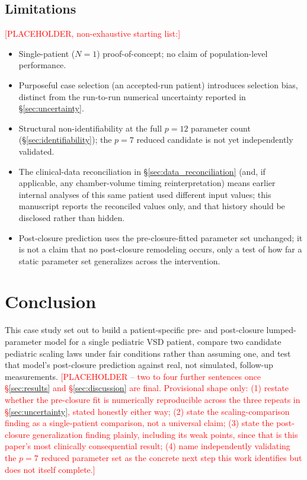 \documentclass{article}
\begin{document}
\subsection{Limitations}
\label{sec:limitations}
\textcolor{red}{[PLACEHOLDER, non-exhaustive starting list:]}
\begin{itemize}[leftmargin=1.5em]
    \item Single-patient (\(N=1\)) proof-of-concept; no claim of population-level performance.
    \item Purposeful case selection (an accepted-run patient) introduces selection bias, distinct from the run-to-run numerical uncertainty reported in \S\ref{sec:uncertainty}.
    \item Structural non-identifiability at the full $p=12$ parameter count (\S\ref{sec:identifiability}); the $p=7$ reduced candidate is not yet independently validated.
    \item The clinical-data reconciliation in \S\ref{sec:data_reconciliation} (and, if applicable, any chamber-volume timing reinterpretation) means earlier internal analyses of this same patient used different input values; this manuscript reports the reconciled values only, and that history should be disclosed rather than hidden.
    \item Post-closure prediction uses the pre-closure-fitted parameter set unchanged; it is not a claim that no post-closure remodeling occurs, only a test of how far a static parameter set generalizes across the intervention.
\end{itemize}

\section{Conclusion}
\label{sec:conclusion}

This case study set out to build a patient-specific pre- and post-closure lumped-parameter model for a single pediatric VSD patient, compare two candidate pediatric scaling laws under fair conditions rather than assuming one, and test that model's post-closure prediction against real, not simulated, follow-up measurements. \textcolor{red}{[PLACEHOLDER -- two to four further sentences once \S\ref{sec:results} and \S\ref{sec:discussion} are final. Provisional shape only: (1) restate whether the pre-closure fit is numerically reproducible across the three repeats in \S\ref{sec:uncertainty}, stated honestly either way; (2) state the scaling-comparison finding as a single-patient comparison, not a universal claim; (3) state the post-closure generalization finding plainly, including its weak points, since that is this paper's most clinically consequential result; (4) name independently validating the $p{=}7$ reduced parameter set as the concrete next step this work identifies but does not itself complete.]}
\end{document}
